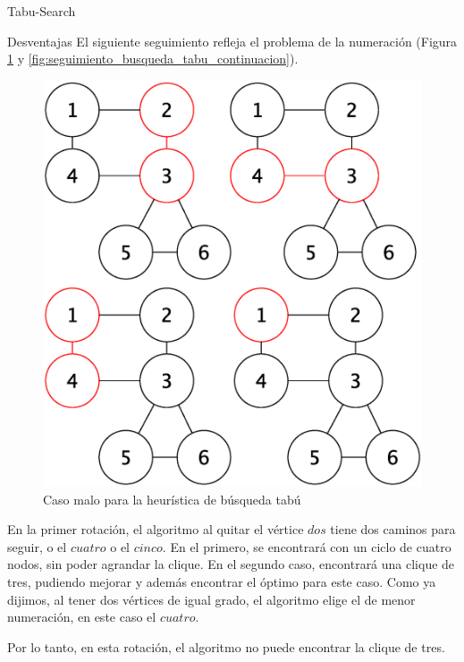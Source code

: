 \begin{section}{Tabu-Search}
\begin{subsection}{Desventajas}
		El siguiente seguimiento refleja el problema de la numeración (Figura \ref{fig:seguimiento_busqueda_tabu} y \ref{fig:seguimiento_busqueda_tabu_continuacion}).

			\begin{figure}[H]
				\centering
		    	\includegraphics[scale=0.5]{tabu_search/segCasoMalo.eps}
			    \caption{Caso malo para la heurística de búsqueda tabú}
			    \label{fig:seguimiento_busqueda_tabu}
			\end{figure}

		En la primer rotación, el algoritmo al quitar el vértice $dos$ tiene dos caminos para seguir, o el $cuatro$ o el $cinco$. En el primero, se encontrará con un ciclo de cuatro nodos, sin poder agrandar la clique. En el segundo caso, encontrará una clique de tres, pudiendo mejorar y además encontrar el óptimo para este caso. Como ya dijimos, al tener dos vértices de igual grado, el algoritmo elige el de menor numeración, en este caso el $cuatro$. 

		Por lo tanto, en esta rotación, el algoritmo no puede encontrar la clique de tres.


\end{subsection}
\end{section}
